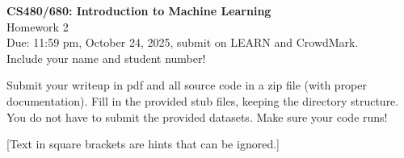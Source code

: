 \documentclass[10pt,letter,notitlepage]{article}
\begin{document}
\begin{center}
\large{\textbf{CS480/680: Introduction to Machine Learning} \\ Homework 2\\ Due: 11:59 pm, October 24, 2025, submit on LEARN and CrowdMark.} \\

Include your name and student number!

\end{center}

\begin{center}
Submit your writeup in pdf and all source code in a zip file (with proper documentation). 
Fill in the provided stub files, keeping the directory structure. You do not have to submit the provided datasets.
Make sure your code runs!

[Text in square brackets are hints that can be ignored.]
\end{center}
\end{document}
